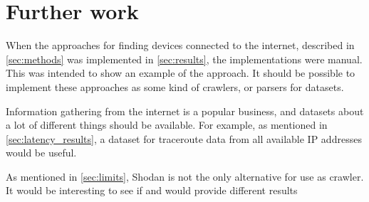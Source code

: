 \section{Further work}


When the approaches for finding devices connected to the internet, described in \cref{sec:methods} was implemented in \cref{sec:results}, the implementations were manual. This was intended to show an example of the approach. It should be possible to implement these approaches as some kind of crawlers, or parsers for datasets.

Information gathering from the internet is a popular business, and datasets about a lot of different things should be available. For example, as mentioned in \cref{sec:latency_results}, a dataset for traceroute data from all available IP addresses would be useful. 

As mentioned in \cref{sec:limits}, Shodan is not the only alternative for use as crawler. It would be interesting to see if \href{https://censys.io/}{\color{blue}{Censys}}\cite{censys} and \href{www.zoomeye.org}{\color{blue}{ZoomEye}}\cite{zoomeye} would provide different results
